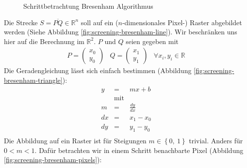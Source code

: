\begin{Algorithmus}
\begin{figure}
{
        \label{fig:screening-bresenham-pixels}
        }
        \caption{Schrittbetrachtung Bresenham Algorithmus}
        \label{fig:screening-bresenham}
    \end{figure}
    Die Strecke $S = \overline{PQ} \in \mathbb{R}^n$ soll auf ein 
    ($n$-dimensionales Pixel-) Raster abgebildet werden (Siehe Abbildung 
    \ref{fig:screening-bresenham-line}). 
    Wir beschränken uns hier auf die Berechnung im $\mathbb{R}^2$. 
    $P$ und $Q$ seien gegeben mit 
    \begin{equation*}\begin{matrix}
        P = \begin{pmatrix} x_0 \\ y_0 \end{pmatrix} & 
        Q = \begin{pmatrix} x_1 \\ y_1 \end{pmatrix} & 
        \forall x_i, y_i \in \mathbb{R}
    \end{matrix}\end{equation*}
    Die Geradengleichung lässt sich einfach bestimmen (Abbildung 
    \ref{fig:screening-bresenham-triangle}):
    \begin{equation*}\begin{matrix}
        y & = & mx + b \\
        & \textrm{mit} & \\
        m & = & \frac{dy}{dx} \\
        dx & = & x_1 - x_0 \\
        dy & = & y_1 - y_0 \\
    \end{matrix}\end{equation*}
    Die Abbildung auf ein Raster ist für Steigungen 
    $m \in \left\{ 0,~ 1 \right\}$ trivial. 
    Anders für $0 < m < 1$. 
    Dafür betrachten wir in einem Schritt benachbarte Pixel 
    (Abbildung \vref{fig:screening-bresenham-pixels}): 

\end{Algorithmus}
